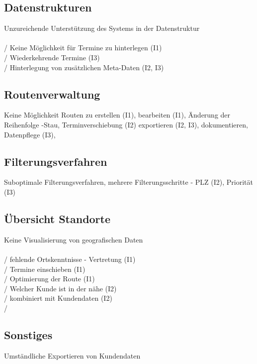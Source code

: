 \documentclass[Bachelorarbeit.tex]{subfiles}
\begin{document}
\subsection*{Datenstrukturen}
\label{p2}
Unzureichende Unterstützung des Systems in der  Datenstruktur\\
\\
/ Keine Möglichkeit für Termine zu hinterlegen (I1)\\
/ Wiederkehrende Termine (I3)\\
/ Hinterlegung von zusätzlichen Meta-Daten (I2, I3)\\


\subsection*{Routenverwaltung}
\label{p3}
Keine Möglichkeit Routen zu erstellen (I1), bearbeiten (I1), Änderung der Reihenfolge -Stau, Terminverschiebung (I2) exportieren (I2, I3), dokumentieren, Datenpflege (I3), 

\subsection*{Filterungsverfahren}
\label{p4}
Suboptimale Filterungsverfahren, mehrere Filterungsschritte - PLZ (I2), Priorität (I3)


\subsection*{Übersicht Standorte}
\label{p5}
Keine Visualisierung von geografischen Daten\\
\\
/ fehlende Ortskenntnisse - Vertretung (I1) \\
/ Termine einschieben (I1)\\
/ Optimierung der Route (I1)\\
/ Welcher Kunde ist in der nähe (I2)\\
/ kombiniert mit Kundendaten (I2)\\
/ 

\subsection*{Sonstiges}
\label{p6}
Umständliche Exportieren von Kundendaten
\end{document}
